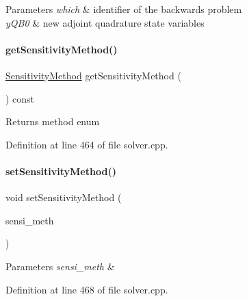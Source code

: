 \begin{DoxyParams}{Parameters}
{\em which} & identifier of the backwards problem \\
\hline
{\em y\+Q\+B0} & new adjoint quadrature state variables \\
\hline
\end{DoxyParams}
\mbox{\label{classamici_1_1_solver_a888cb7142e103c84bdeeb99566aba65a}} 
\paragraph{\texorpdfstring{getSensitivityMethod()}{getSensitivityMethod()}}
{\footnotesize\ttfamily \mbox{\hyperlink{namespaceamici_aa0fa493529f6872e7e776b91fbbf38f9}{Sensitivity\+Method}} get\+Sensitivity\+Method (\begin{DoxyParamCaption}{ }\end{DoxyParamCaption}) const}

\begin{DoxyReturn}{Returns}
method enum 
\end{DoxyReturn}


Definition at line 464 of file solver.\+cpp.

\mbox{\label{classamici_1_1_solver_a3a7713f2ce77ffade77445a825ad289d}} 
\paragraph{\texorpdfstring{setSensitivityMethod()}{setSensitivityMethod()}}
{\footnotesize\ttfamily void set\+Sensitivity\+Method (\begin{DoxyParamCaption}\item[{\mbox{\hyperlink{namespaceamici_aa0fa493529f6872e7e776b91fbbf38f9}{Sensitivity\+Method}}}]{sensi\+\_\+meth }\end{DoxyParamCaption})}


\begin{DoxyParams}{Parameters}
{\em sensi\+\_\+meth} & \\
\hline
\end{DoxyParams}


Definition at line 468 of file solver.\+cpp.

